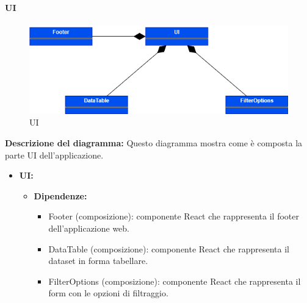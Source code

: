 \paragraph{UI}
\begin{figure}[h!] \centering
    \includegraphics[scale=0.45]{template/images/uml_front/ui/ui.png}
    \caption{UI}
\end{figure}
\textbf{Descrizione del diagramma:}
Questo diagramma mostra come è composta la parte UI dell'applicazione.
\begin{itemize}
    \item \textbf{UI:}
    \begin{itemize}
        \item \textbf{Dipendenze:}
        \begin{itemize}
            \item Footer (composizione): componente React che rappresenta il footer dell'applicazione web.
            \item DataTable (composizione): componente React che rappresenta il dataset in forma tabellare.
            \item FilterOptions (composizione): componente React che rappresenta il form con le opzioni di filtraggio.
        \end{itemize} 
    \end{itemize}
\end{itemize}

\pagebreak


